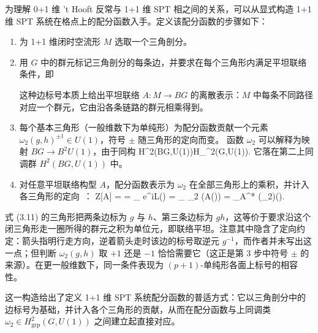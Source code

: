 为理解 0+1 维 't Hooft 反常与 1+1 维 SPT 相之间的关系，可以从显式构造 1+1 维 SPT 系统在格点上的配分函数入手。定义该配分函数的步骤如下：
\begin{enumerate}
    \item 为 1+1 维闭时空流形 $M$ 选取一个三角剖分。
    \item 用 $G$ 中的群元标记三角剖分的每条边，并要求在每个三角形内满足平坦联络条件，即
    \be\label{eq:tri}
    \ee
    这种边标号本质上给出平坦联络 $A: M \to BG$ 的离散表示：$M$ 中每条不同路径对应一个群元，它由沿各条链路的群元相乘得到。
    \item 每个基本三角形（一般维数下为单纯形）为配分函数贡献一个元素 $\omega_2(g, h)^{\pm 1} \in U(1)$，符号 $\pm$ 随三角形的定向而变。
    函数 $\omega_2$ 可以解释为映射 $ BG \to B^2 U(1) $，由于同构
    \be [BG, B^2U(1)]\cong H^2(BG,U(1))\cong H_^2(G,U(1)).  \ee
    它落在第二上同调群 $H^2(BG, U(1))$ 中。
    \item 对任意平坦联络构型 $A$，配分函数表示为 $\omega_2$ 在全部三角形上的乘积，并计入各三角形的定向~\cite{chen2013symmetry}：
    \be Z[A] =   = \prod_{\Delta} e^{iL(\Delta)} = \prod_{\Delta} \omega_2 (A(\Delta)) = \prod_{\Delta}A^* (\omega_2)(\Delta).
    \ee
\end{enumerate}

\begin{yizhu}
式 (3.11) 的三角形把两条边标为 $g$ 与 $h$、第三条边标为 $gh$，这等价于要求沿这个闭三角形走一圈所得的群元之积为单位元，即联络平坦。注意其中隐含了定向约定：箭头指明行走方向，逆着箭头走时该边的标号取逆元 $g^{-1}$，而作者并未写出这一点；但判断 $\omega_2(g,h)$ 取 $+1$ 还是 $-1$ 恰恰需要它（这正是第 3 步中符号 $\pm$ 的来源）。在更一般维数下，同一条件表现为 $(p+1)$-单纯形各面上标号的相容性。
\end{yizhu}

这一构造给出了定义 1+1 维 SPT 系统配分函数的普适方式：它以三角剖分中的边标号为基础，并计入各个三角形的贡献，从而在配分函数与上同调类 $ \omega_2 \in H^2_\mathrm{grp}(G,U(1))$ 之间建立起直接对应。

